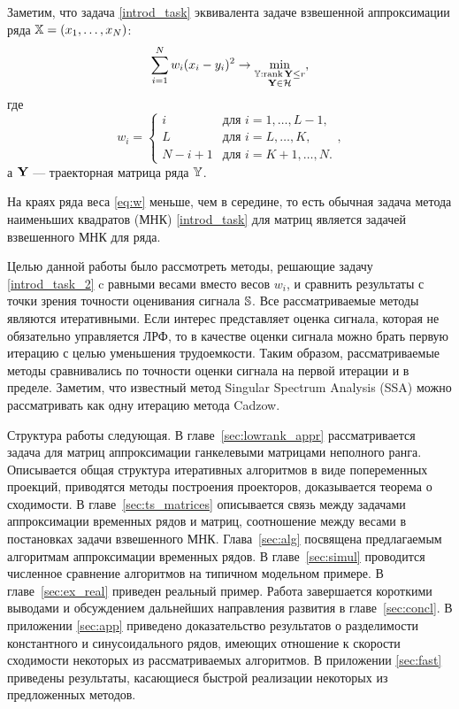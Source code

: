 \documentclass[12pt, specialist, subf,href,colorlinks=true,substylefile = spbu.rtx]{disser}
\def\rank{\mathop{\mathrm{rank}}}
\theoremstyle{remark}
\theoremstyle{definition}
\begin{document}
Заметим, что задача \eqref{introd_task} эквивалента задаче взвешенной аппроксимации ряда $\mathbb{X} = (x_1, \ldots, x_N)$:
\begin{equation}\label{introd_task_2}
\sum_{i = 1}^N w_i(x_i - y_i)^2 \to \min_{\substack{\tsY: \rank \bfY \le r \\ \bfY \in \calH}},
\end{equation}
где
\begin{equation}
\label{eq:w}
w_i = \begin{cases}
i & \text{для $i = 1, \ldots, L-1,$}\\
L & \text{для $i = L, \ldots, K,$}\\
N - i + 1 & \text{для $i = K + 1, \ldots, N.$}
\end{cases},
\end{equation}
а $\mathbf{Y}$ --- траекторная матрица ряда $\mathbb{Y}$.

На краях ряда веса \eqref{eq:w} меньше, чем в середине, то есть обычная задача метода наименьших квадратов (МНК) \eqref{introd_task} для матриц является задачей взвешенного МНК для ряда.

Целью данной работы было рассмотреть методы, решающие задачу \eqref{introd_task_2} c равными весами вместо весов $w_i$, и сравнить результаты с точки зрения точности оценивания сигнала $\mathbb{S}$. Все рассматриваемые методы являются итеративными. Если интерес представляет оценка сигнала, которая не обязательно управляется ЛРФ, то в качестве оценки сигнала можно брать первую итерацию с целью уменьшения трудоемкости. Таким образом, рассматриваемые методы сравнивались по точности оценки сигнала на первой итерации и в пределе. Заметим, что известный метод Singular Spectrum Analysis (SSA) \cite{Broomhead.King1986, Vautard.etal1992, Elsner.Tsonis1996, Golyandina.etal2001, Ghil.etal2002, Golyandina.Zhigljavsky2012} можно
рассматривать как одну итерацию метода Cadzow.

Структура работы следующая.  В главе~\ref{sec:lowrank_appr} рассматривается задача для матриц аппроксимации ганкелевыми матрицами неполного ранга.
Описывается общая структура итеративных алгоритмов в виде попеременных проекций, приводятся методы построения проекторов, доказывается теорема о сходимости.
В главе~\ref{sec:ts_matrices} описывается связь между задачами аппроксимации временных рядов и матриц, соотношение между весами в постановках задачи
взвешенного МНК. Глава~\ref{sec:alg} посвящена предлагаемым алгоритмам аппроксимации временных рядов. В главе~\ref{sec:simul} проводится численное сравнение алгоритмов на типичном модельном примере. В главе~\ref{sec:ex_real} приведен реальный пример.
Работа завершается короткими выводами и обсуждением дальнейших направления развития в главе~\ref{sec:concl}. В приложении \ref{sec:app} приведено доказательство результатов
о разделимости константного и синусоидального рядов, имеющих отношение к скорости сходимости некоторых из рассматриваемых алгоритмов. В приложении \ref{sec:fast} приведены результаты, касающиеся быстрой реализации некоторых из предложенных методов.
\end{document}
